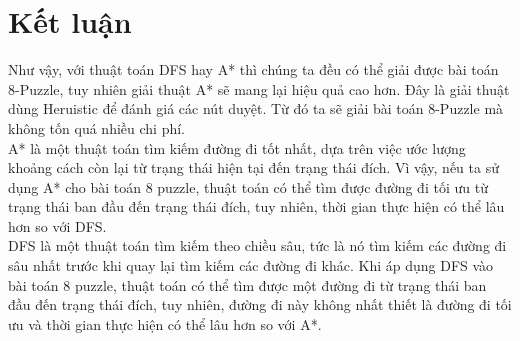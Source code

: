 \def\baselinestretch{1}
\chapter{Kết luận}
\ifpdf
    \graphicspath{{Conclusions/ConclusionsFigs/PNG/}{Conclusions/ConclusionsFigs/PDF/}{Conclusions/ConclusionsFigs/}}
\else
    \graphicspath{{Conclusions/ConclusionsFigs/EPS/}{Conclusions/ConclusionsFigs/}}
\fi

\def\baselinestretch{1.66}

Như vậy, với thuật toán DFS hay A* thì chúng ta đều có thể giải được bài toán 8-Puzzle, tuy nhiên giải thuật A* sẽ mang lại hiệu quả cao hơn. Đây là giải thuật dùng Heruistic để đánh giá các nút duyệt. Từ đó ta sẽ giải bài toán 8-Puzzle mà không tốn quá nhiều chi phí.\\
A* là một thuật toán tìm kiếm đường đi tốt nhất, dựa trên việc ước lượng khoảng cách còn lại từ trạng thái hiện tại đến trạng thái đích. Vì vậy, nếu ta sử dụng A* cho bài toán 8 puzzle, thuật toán có thể tìm được đường đi tối ưu từ trạng thái ban đầu đến trạng thái đích, tuy nhiên, thời gian thực hiện có thể lâu hơn so với DFS.\\

DFS là một thuật toán tìm kiếm theo chiều sâu, tức là nó tìm kiếm các đường đi sâu nhất trước khi quay lại tìm kiếm các đường đi khác. Khi áp dụng DFS vào bài toán 8 puzzle, thuật toán có thể tìm được một đường đi từ trạng thái ban đầu đến trạng thái đích, tuy nhiên, đường đi này không nhất thiết là đường đi tối ưu và thời gian thực hiện có thể lâu hơn so với A*.\\